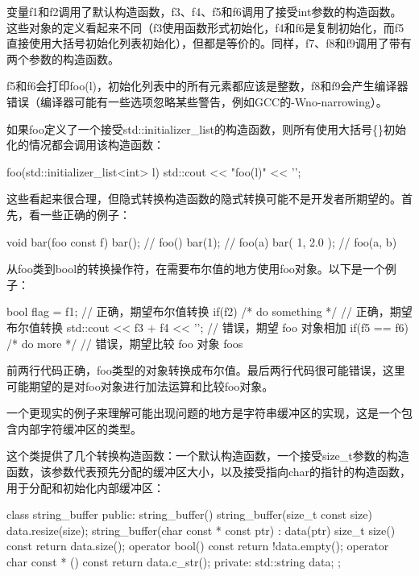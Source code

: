 变量f1和f2调用了默认构造函数，f3、f4、f5和f6调用了接受int参数的构造函数。这些对象的定义看起来不同（f3使用函数形式初始化，f4和f6是复制初始化，而f5直接使用大括号初始化列表初始化），但都是等价的。同样，f7、f8和f9调用了带有两个参数的构造函数。

f5和f6会打印foo(l)，初始化列表中的所有元素都应该是整数，f8和f9会产生编译器错误（编译器可能有一些选项忽略某些警告，例如GCC的-Wno-narrowing）。

如果foo定义了一个接受std::initializer\_list的构造函数，则所有使用大括号\{\}初始化的情况都会调用该构造函数：

\begin{cpp}
foo(std::initializer_list<int> l)
{ std::cout << "foo(l)" << '\n'; }
\end{cpp}

这些看起来很合理，但隐式转换构造函数的隐式转换可能不是开发者所期望的。首先，看一些正确的例子：

\begin{cpp}
void bar(foo const f)
{
}
bar({});             // foo()
bar(1);              // foo(a)
bar({ 1, 2.0 });     // foo(a, b)
\end{cpp}

从foo类到bool的转换操作符，在需要布尔值的地方使用foo对象。以下是一个例子：

\begin{cpp}
bool flag = f1;                // 正确，期望布尔值转换
if(f2) { /* do something */ }  // 正确，期望布尔值转换
std::cout << f3 + f4 << '\n';  // 错误，期望 foo 对象相加
if(f5 == f6) { /* do more */ } // 错误，期望比较 foo 对象 foos
\end{cpp}

前两行代码正确，foo类型的对象转换成布尔值。最后两行代码很可能错误，这里可能期望的是对foo对象进行加法运算和比较foo对象。

一个更现实的例子来理解可能出现问题的地方是字符串缓冲区的实现，这是一个包含内部字符缓冲区的类型。

这个类提供了几个转换构造函数：一个默认构造函数，一个接受size\_t参数的构造函数，该参数代表预先分配的缓冲区大小，以及接受指向char的指针的构造函数，用于分配和初始化内部缓冲区：

\begin{cpp}
class string_buffer
{
public:
    string_buffer() {}
    string_buffer(size_t const size) { data.resize(size); }
    string_buffer(char const * const ptr) : data(ptr) {}
    size_t size() const { return data.size(); }
    operator bool() const { return !data.empty(); }
    operator char const * () const { return data.c_str(); }
private:
    std::string data;
};
\end{cpp}

